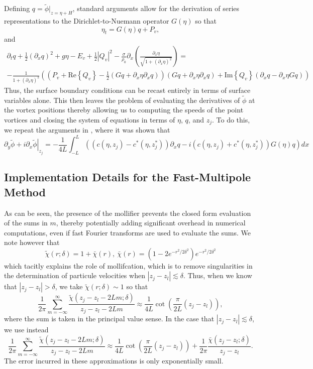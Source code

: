 \documentclass[a4paper,11pt]{article}
\newcommand{\p}{\partial}
\begin{document}
Defining $q = \tilde{\phi}|_{z=\eta+H}$, standard arguments \cite{craig,curtis} allow for the derivation of series representations to the Dirichlet-to-Nuemann operator $G(\eta)$ so that 
\[
\eta_{t} = G(\eta)q + P_{v},
\]
and 
\begin{multline*}
\p_{t}q + \frac{1}{2}\left(\p_{x}q\right)^{2} + g\eta - E_{v} + \frac{1}{2}\left|Q_{v}\right|^{2} - \frac{\sigma}{\rho_{0}}\p_{x}\left(\frac{\p_{x}\eta}{\sqrt{1+(\p_{x}\eta)^{2}}} \right)=\\
- \frac{1}{1+(\p_{x}\eta)^{2}}\left(\left(P_{v}+\mbox{Re}\left\{Q_{v}\right\}-\frac{1}{2}\left(Gq+\p_{x}\eta\p_{x}q\right)\right)\left(Gq+\p_{x}\eta\p_{x}q\right) + \mbox{Im}\left\{Q_{v}\right\}(\p_{x}q - \p_{x}\eta Gq) \right) 
\end{multline*}
Thus, the surface boundary conditions can be recast entirely in terms of surface variables alone.  This then leaves the problem of evaluating the derivatives of $\tilde{\phi}$ at the vortex positions thereby allowing us to computing the speeds of the point vortices and closing the system of equations in terms of $\eta$, $q$, and $z_{j}$.  To do this, we repeat the arguments in \cite{curtis}, where it was shown that 
\[
\left. \p_{y}\tilde{\phi} + i\p_{x}\tilde{\phi}\right|_{z_{j}} = -\frac{1}{4L}\int_{-L}^{L}\left((c(\eta,z_{j})-c^{\ast}(\eta,z^{\ast}_{j}))\p_{x}q - i(c(\eta,z_{j})+c^{\ast}(\eta,z^{\ast}_{j}))G(\eta)q \right)dx
\]
\subsection*{Implementation Details for the Fast-Multipole Method}
As can be seen, the presence of the mollifier prevents the closed form evaluation of the sums in $m$, thereby potentially adding significant overhead in numerical computations, even if fast Fourier transforms are used to evaluate the sums.  We note however that 
\[
\tilde{\chi}(r;\delta) = 1 + \bar{\chi}(r), ~ \bar{\chi}(r) = \left(1-2e^{-r^2/2\delta^{2}} \right)e^{-r^2/2\delta^{2}}
\]
which tacitly explains the role of mollifcation, which is to remove singularities in the determination of particule velocities when $\left|z_{j}-z_{l} \right|\lesssim \delta$.  Thus, when we know that $\left|z_{j}-z_{l} \right| > \delta$, we take $\tilde{\chi}(r;\delta) \sim 1$ so that 
\[
\frac{1}{2\pi}\sum_{m=-\infty}^{\infty} \frac{\tilde{\chi}(z_{j}-z_{l}-2Lm;\delta)}{z_{j}-z_{l}-2Lm} \approx \frac{1}{4L}\cot\left(\frac{\pi}{2L}\left(z_{j}-z_{l}\right) \right),
\]
where the sum is taken in the principal value sense.  In the case that $\left|z_{j}-z_{l} \right|\lesssim \delta$, we use instead 
\[
\frac{1}{2\pi}\sum_{m=-\infty}^{\infty} \frac{\tilde{\chi}(z_{j}-z_{l}-2Lm;\delta)}{z_{j}-z_{l}-2Lm} \approx \frac{1}{4L}\cot\left(\frac{\pi}{2L}\left(z_{j}-z_{l}\right) \right) + \frac{1}{2\pi}\frac{\bar{\chi}(z_{j}-z_{l};\delta)}{z_{j}-z_{l}}.
\]
The error incurred in these approximations is only exponentially small.  
\end{document}

